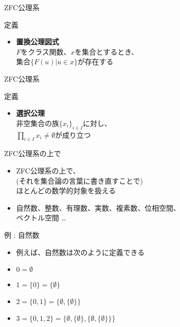 \documentclass[17pt,aspectratio=169,xcolor=dvipsnames,table,dvipdfmx]{beamer}
\theoremstyle{definition}
\begin{document}
\begin{frame}{ZFC公理系}
    \begin{block}{定義}
        \begin{itemize}
            \item \textbf{置換公理図式} \\
                  $F$をクラス関数、$x$を集合とするとき、\\
                  集合$\{ F(u) | u \in x \}$が存在する
        \end{itemize}
    \end{block}
\end{frame}


\begin{frame}{ZFC公理系}
    \begin{block} {定義}
        \begin{itemize}
            \item \textbf{選択公理} \\
                  非空集合の族$\{x_i\}_{i \in I}$に対し、\\
                  $\prod_{i \in I} x_i \neq \emptyset$が成り立つ
        \end{itemize}
    \end{block}
\end{frame}


\begin{frame}{ZFC公理系の上で}
    \begin{itemize}

        \item ZFC公理系の上で、\\(それを集合論の言葉に書き直すことで)\\ ほとんどの数学的対象を扱える
        \item 自然数、整数、有理数、実数、複素数、位相空間、\\ ベクトル空間 \dots

    \end{itemize}
\end{frame}

\begin{frame}{例 : 自然数}
    \begin{itemize}
        \item 例えば、自然数は次のように定義できる
        \item $0 = \emptyset$
        \item $1 = \{0\} = \{\emptyset\}$
        \item $2 = \{0, 1\} = \{\emptyset, \{\emptyset\}\}$
        \item $3 = \{0, 1, 2\} = \{\emptyset, \{\emptyset\}, \{\emptyset, \{\emptyset\}\}\}$
    \end{itemize}
\end{frame}
\end{document}
